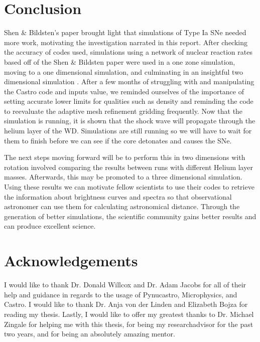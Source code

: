 \documentclass[preprint]{aastex62}
\begin{document}

\newpage

\section{Conclusion}

  
  Shen \& Bildsten's paper brought light that simulations of Type Ia SNe needed more work, motivating the investigation narrated in this report. After checking the accuracy of codes used, simulations using a network of nuclear reaction rates based off of the Shen \& Bildsten paper were used in a one zone simulation, moving to a one dimensional simulation, and culminating in an insightful two dimensional simulation \citep{shenNbildsten}. After a few months of struggling with and manipulating the Castro code and inputs value, we reminded ourselves of the importance of setting accurate lower limits for qualities such as density and reminding the code to reevaluate the adaptive mesh refinement gridding frequently. Now that the simulation is running, it is shown that the shock wave will propagate through the helium layer of the WD. Simulations are still running so we will have to wait for them to finish before we can see if the core detonates and causes the SNe. 
  
  The next steps moving forward will be to perform this in two dimensions with rotation involved comparing the results between runs with different Helium layer masses. Afterwards, this may be promoted to a three dimensional simulation. Using these results we can motivate fellow scientists to use their codes to retrieve the information about brightness curves and spectra so that observational astronomer can use them for calculating astronomical distance. Through the generation of better simulations, the scientific community gains better results and can produce excellent science. 
  
  
 \newpage
  
\section{Acknowledgements}

I would like to thank Dr. Donald Willcox and Dr. Adam Jacobs for all of their help and guidance in regards to the usage of Pynucastro, Microphysics, and Castro. I would like to thank Dr. Anja von der Linden and Elizabeth Bojza for reading my thesis. Lastly, I would like to offer my greatest thanks to Dr. Michael Zingale for helping me with this thesis, for being my researchadvisor for the past two years, and for being an absolutely amazing mentor. 

\newpage


\end{document}

